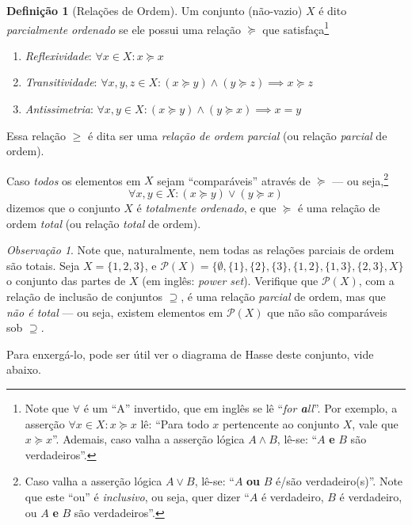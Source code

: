 \documentclass[12pt]{article}
\numberwithin{equation}{section}
\theoremstyle{plain}
\theoremstyle{definition}
\newtheorem{definition}[theorem]{Definição}
\theoremstyle{remark}
\newtheorem*{remark}{Observação}
\newcommand{\pref}{\succeq}
\begin{document}
\begin{definition}[Relações de Ordem]
  Um conjunto (não-vazio) \(X\) é dito \emph{parcialmente ordenado} se ele possui uma relação \(\pref\) que satisfaça\footnote{Note que \(\forall\)   é um ``A'' invertido, que em inglês se lê ``\emph{for \textbf{a}ll}''.
  Por exemplo, a asserção \(\forall x \in X: x \pref x\) lê: ``Para todo
  \(x\) pertencente ao conjunto \(X\), vale que \(x \pref x\)''. Ademais,
  caso valha a asserção lógica \(A \land B\), lê-se: ``\(A\) \textbf{e}
  \(B\) são verdadeiros''.} 
  
  \begin{enumerate}
    \item \emph{Reflexividade}:
\(\forall x \in X: x \pref x\)
    \item \emph{Transitividade}:
\(\forall x, y, z \in X: (x \pref y) \land (y \pref z) \implies x \pref z\)
    \item \emph{Antissimetria}:
\(\forall x, y \in X: (x\pref y) \land (y \pref x) \implies x = y\)
  \end{enumerate}


Essa relação \(\geq\) é dita ser uma \emph{relação de ordem parcial} (ou
relação \emph{parcial} de ordem).

Caso \emph{todos} os elementos em \(X\) sejam ``comparáveis'' através de
\(\pref\) --- ou seja,\footnote{Caso valha a asserção lógica
  \(A \lor B\), lê-se: ``\(A\) \textbf{ou} \(B\) é/são verdadeiro(s)''.
  Note que este ``ou'' é \emph{inclusivo}, ou seja, quer dizer ``\(A\) é
  verdadeiro, \(B\) é verdadeiro, ou \(A\) \textbf{e} \(B\) são
  verdadeiros''.} \[
\forall x, y \in X: (x \pref y) \lor (y \pref x)
\] dizemos que o conjunto \(X\) é \emph{totalmente ordenado}, e que
\(\pref\) é uma relação de ordem \emph{total} (ou relação \emph{total} de
ordem).


\begin{remark}
  
  Note que, naturalmente, nem todas as relações parciais de ordem são
  totais. Seja \(X = \{ 1,2,3\}\), e
\(\mathcal{P}(X) = \{ \emptyset, \{ 1 \}, \{ 2 \}, \{ 3 \}, \{ 1,2 \}, \{ 1,3 \}, \{ 2,3 \}, X \}\)
o conjunto das partes de \(X\) (em inglês: \emph{power set}). Verifique
que \(\mathcal{P}(X)\), com a relação de inclusão de conjuntos
\(\supseteq\), é uma relação \emph{parcial} de ordem, mas que \emph{não
é total} --- ou seja, existem elementos em \(\mathcal{P}(X)\) que não
são comparáveis sob \(\supseteq\).

Para enxergá-lo, pode ser útil ver o diagrama de Hasse deste conjunto, vide abaixo. 


\end{remark}
\end{definition}
\end{document}
